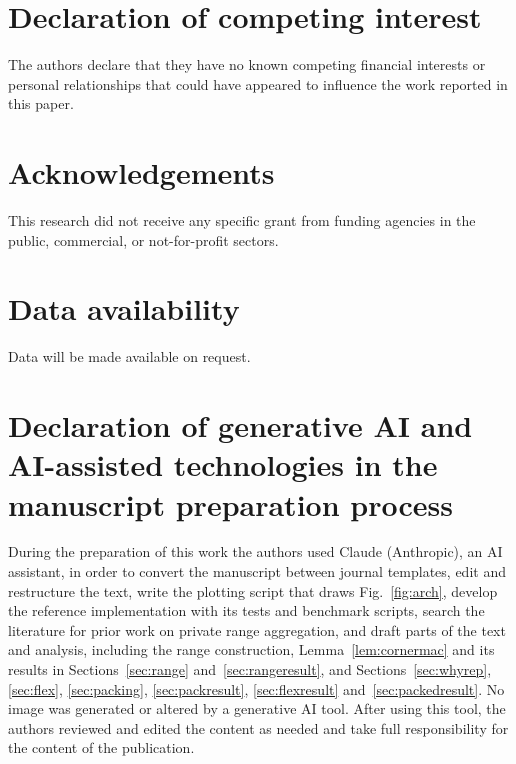 \documentclass[a4paper,fleqn]{cas-sc}
\newif\ifanonymous
\begin{document}
\ifanonymous\else\printcredits\fi

\section*{Declaration of competing interest}
The authors declare that they have no known competing financial interests or
personal relationships that could have appeared to influence the work reported
in this paper.

\section*{Acknowledgements}
This research did not receive any specific grant from funding agencies in the
public, commercial, or not-for-profit sectors.

\section*{Data availability}
Data will be made available on request.

\section*{Declaration of generative AI and AI-assisted technologies in the
manuscript preparation process}
During the preparation of this work the authors used Claude (Anthropic), an
AI assistant, in order to convert the manuscript between journal templates,
edit and restructure the text, write the plotting script that draws
Fig.~\ref{fig:arch}, develop the reference implementation with its tests
and benchmark scripts, search the literature for prior work on private range
aggregation, and draft parts of the text and analysis, including the range
construction, Lemma~\ref{lem:cornermac} and its results in
Sections~\ref{sec:range} and~\ref{sec:rangeresult}, and
Sections~\ref{sec:whyrep}, \ref{sec:flex}, \ref{sec:packing},
\ref{sec:packresult}, \ref{sec:flexresult} and~\ref{sec:packedresult}. No image was generated or
altered by a generative AI tool. After using this tool, the authors reviewed
and edited the content as needed and take full responsibility for the content
of the publication.



\end{document}
